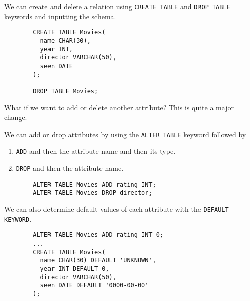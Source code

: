 \documentclass{article}
\begin{document}
    \begin{theorem}
      We can create and delete a relation using \texttt{CREATE TABLE} and \texttt{DROP TABLE} keywords and inputting the schema. 
      \begin{lstlisting}
        CREATE TABLE Movies(
          name CHAR(30), 
          year INT, 
          director VARCHAR(50), 
          seen DATE
        ); 

        DROP TABLE Movies; 
      \end{lstlisting}
    \end{theorem}

    What if we want to add or delete another attribute? This is quite a major change. 

    \begin{theorem}
      We can add or drop attributes by using the \texttt{ALTER TABLE} keyword followed by 
      \begin{enumerate}
        \item \texttt{ADD} and then the attribute name and then its type. 
        \item \texttt{DROP} and then the attribute name. 
      \end{enumerate}
      \begin{lstlisting}
        ALTER TABLE Movies ADD rating INT; 
        ALTER TABLE Movies DROP director; 
      \end{lstlisting}
    \end{theorem}

    \begin{theorem}
      We can also determine default values of each attribute with the \texttt{DEFAULT KEYWORD}. 
      \begin{lstlisting}
        ALTER TABLE Movies ADD rating INT 0; 
        ...
        CREATE TABLE Movies(
          name CHAR(30) DEFAULT 'UNKNOWN', 
          year INT DEFAULT 0, 
          director VARCHAR(50), 
          seen DATE DEFAULT '0000-00-00'
        ); 
      \end{lstlisting}
      
    \end{theorem}
\end{document}
